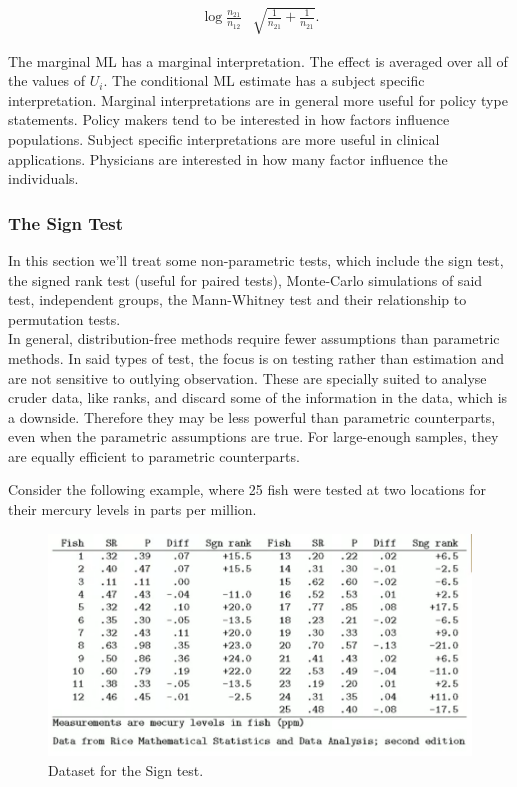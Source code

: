 \documentclass{homework}
\begin{document}
\begin{align*}
    \log \frac{n_{21}}{n_{12}} & \sqrt{\frac{1}{n_{21}}+\frac{1}{n_{21}}}.  
\end{align*}

The marginal ML has a marginal interpretation. The effect is averaged over all of the values of $U_i$. The conditional ML estimate has a subject specific interpretation. Marginal interpretations are in general more useful for policy type statements. Policy makers tend to be interested in how factors influence populations. Subject specific interpretations are more useful in clinical applications. Physicians are interested in how many factor influence the individuals. 

\subsubsection{The Sign Test}

In this section we'll treat some non-parametric tests, which include the sign test, the signed rank test (useful for paired tests),  Monte-Carlo simulations of said test, independent groups, the Mann-Whitney test and their relationship to permutation tests. \\

In general, distribution-free methods require fewer assumptions than parametric methods. In said types of test, the focus is on testing rather than estimation and are not sensitive to outlying observation. These are specially suited to analyse cruder data, like ranks, and discard some of the information in the data, which is a downside. Therefore they may be less powerful than parametric counterparts, even when the parametric assumptions are true. For large-enough samples, they are equally efficient to parametric counterparts. 

Consider the following example, where 25 fish were tested at two locations for their mercury levels in parts per million. 

\begin{figure}
    \centering
    \includegraphics[scale=.5]{figs/data points_week4_part8.png}
    \caption{Dataset for the Sign test.}
    \label{fig: sign test}
\end{figure}
\end{document}
